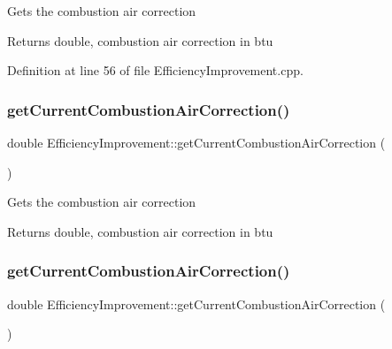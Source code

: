 Gets the combustion air correction

\begin{DoxyReturn}{Returns}
double, combustion air correction in btu 
\end{DoxyReturn}


Definition at line 56 of file Efficiency\+Improvement.\+cpp.

\mbox{\label{class_efficiency_improvement_af50c396ac8ee18f594d6e8b8814f056a}} 
\subsubsection{\texorpdfstring{get\+Current\+Combustion\+Air\+Correction()}{getCurrentCombustionAirCorrection()}\hspace{0.1cm}{\footnotesize\ttfamily [2/3]}}
{\footnotesize\ttfamily double Efficiency\+Improvement\+::get\+Current\+Combustion\+Air\+Correction (\begin{DoxyParamCaption}{ }\end{DoxyParamCaption})}

Gets the combustion air correction

\begin{DoxyReturn}{Returns}
double, combustion air correction in btu 
\end{DoxyReturn}
\mbox{\label{class_efficiency_improvement_af50c396ac8ee18f594d6e8b8814f056a}} 
\subsubsection{\texorpdfstring{get\+Current\+Combustion\+Air\+Correction()}{getCurrentCombustionAirCorrection()}\hspace{0.1cm}{\footnotesize\ttfamily [3/3]}}
{\footnotesize\ttfamily double Efficiency\+Improvement\+::get\+Current\+Combustion\+Air\+Correction (\begin{DoxyParamCaption}{ }\end{DoxyParamCaption})}

